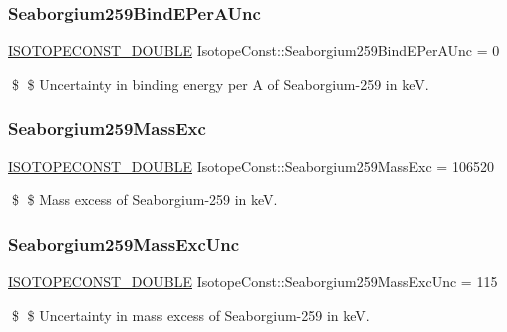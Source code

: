 \subsubsection{\texorpdfstring{Seaborgium259\+Bind\+E\+Per\+A\+Unc}{Seaborgium259BindEPerAUnc}}
{\footnotesize\ttfamily \mbox{\hyperlink{group___isotope_const-_macros_ga8f45a7272ce02c0b4c65c44636ed719a}{I\+S\+O\+T\+O\+P\+E\+C\+O\+N\+S\+T\+\_\+\+D\+O\+U\+B\+LE}} Isotope\+Const\+::\+Seaborgium259\+Bind\+E\+Per\+A\+Unc = 0}

\$ \$ Uncertainty in binding energy per A of Seaborgium-\/259 in keV. \mbox{\label{group___isotope_const-_seaborgium-_sg259_gac24605149551b564bc9824acc46dc26e}} 
\subsubsection{\texorpdfstring{Seaborgium259\+Mass\+Exc}{Seaborgium259MassExc}}
{\footnotesize\ttfamily \mbox{\hyperlink{group___isotope_const-_macros_ga8f45a7272ce02c0b4c65c44636ed719a}{I\+S\+O\+T\+O\+P\+E\+C\+O\+N\+S\+T\+\_\+\+D\+O\+U\+B\+LE}} Isotope\+Const\+::\+Seaborgium259\+Mass\+Exc = 106520}

\$ \$ Mass excess of Seaborgium-\/259 in keV. \mbox{\label{group___isotope_const-_seaborgium-_sg259_ga40d0099b2d3f760d6729988df3023331}} 
\subsubsection{\texorpdfstring{Seaborgium259\+Mass\+Exc\+Unc}{Seaborgium259MassExcUnc}}
{\footnotesize\ttfamily \mbox{\hyperlink{group___isotope_const-_macros_ga8f45a7272ce02c0b4c65c44636ed719a}{I\+S\+O\+T\+O\+P\+E\+C\+O\+N\+S\+T\+\_\+\+D\+O\+U\+B\+LE}} Isotope\+Const\+::\+Seaborgium259\+Mass\+Exc\+Unc = 115}

\$ \$ Uncertainty in mass excess of Seaborgium-\/259 in keV. \mbox{\label{group___isotope_const-_seaborgium-_sg259_ga46ed5bbfb55a0bc9d3eeb84f9bc5fb27}} 
